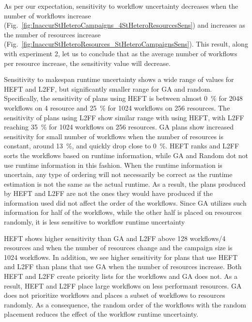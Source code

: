 As per our expectation, sensitivity to workflow uncertainty decreases when the
number of workflows increase
(Fig.~\ref{fig:InaccurStHeteroCampaigns_4StHeteroResourcesSens}) and increases
as the number of resources increase
(Fig.~\ref{fig:InaccurStHeteroResources_StHeteroCampaignsSens}). This result,
along with experiment 2, let us to conclude that as the average number of
workflows per resource increase, the sensitivity value will decrease.

Sensitivity to makespan runtime uncertainty shows a wide range of values for
HEFT and L2FF, but significantly smaller range for GA and random.
Specifically, the sensitivity of plans using HEFT is between almost 0~\% for
2048 workflows on 4 resource and 25~\% for 1024 workflows on 256 resources.
The sensitivity of plans using L2FF show similar range with using HEFT, with
L2FF reaching 35~\% for 1024 workflows on 256 resources. GA plans show
increased sensitivity for small number of workflows when the number of
resources is constant, around 13~\%, and quickly drop close to 0~\%. HEFT
ranks and L2FF sorts the workflows based on runtime information, while GA and
Random dot not use runtime information in this fashion. When the runtime
information is uncertain, any type of ordering will not necessarily be correct
as the runtime estimation is not the same as the actual runtime. As a result,
the plans produced by HEFT and L2FF are not the ones they would have produced
if the information used did not affect the order of the workflows. Since GA
utilizes such information for half of the workflows, while the other half is
placed on resources randomly, it is less sensitive to workflow runtime
uncertainty

HEFT shows higher sensitivity than GA and L2FF above 128 workflows/4 resources
and when the number of resources change and the campaign size is 1024
workflows. In addition, we see higher sensitivity for plans that use HEFT and
L2FF than plans that use GA when the number of resources increase. Both HEFT
and L2FF create priority lists for the workflows and GA does not. As a result,
HEFT and L2FF place large workflows on less performant resources. GA does not
prioritize workflows and places a subset of workflows to resources randomly. As
a consequence, the random order of the workflows with the random placement
reduces the effect of the workflow runtime uncertainty.

